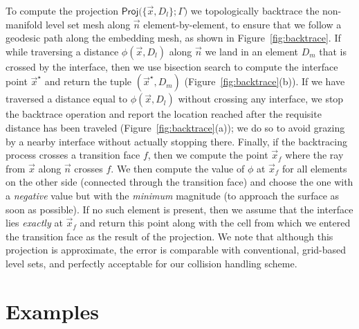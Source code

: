 To compute the projection
$\textsf{Proj(}\{\vec{x},D_l\};\Gamma\textsf{)}$ we topologically
backtrace the non-manifold level set mesh along $\vec{n}$
element-by-element, to ensure that we follow a geodesic path along the
embedding mesh, as shown in Figure~\ref{fig:backtrace}. If while
traversing a distance $\phi(\vec{x},D_l)$ along $\vec{n}$ we land in
an element $D_m$ that is crossed by the interface, then we use
bisection search to compute the interface point $\vec{x}^\star$ and
return the tuple $(\vec{x}^\star,D_m)$
(Figure~\ref{fig:backtrace}(b)). If we have traversed a distance equal
to $\phi(\vec{x},D_l)$ without crossing any interface, we stop the
backtrace operation and report the location reached after the
requisite distance has been traveled (Figure~\ref{fig:backtrace}(a));
we do so to avoid grazing by a nearby interface without actually
stopping there. Finally, if the backtracing process crosses a
transition face $f$, then we compute the point $\vec{x}_f$ where the
ray from $\vec{x}$ along $\vec{n}$ crosses $f$. We then compute the
value of $\phi$ at $\vec{x}_f$ for all elements on the other side
(connected through the transition face) and choose the one with a
\emph{negative} value but with the \emph{minimum} magnitude (to
approach the surface as soon as possible). If no such element is
present, then we assume that the interface lies \emph{exactly} at
$\vec{x}_f$ and return this point along with the cell from which we
entered the transition face as the result of the projection. We note
that although this projection is approximate, the error is comparable
with conventional, grid-based level sets, and perfectly acceptable for
our collision handling scheme.




\vspace*{-.02in}
\section{Examples}
\label{sec:examples}
\vspace*{-.03in}


